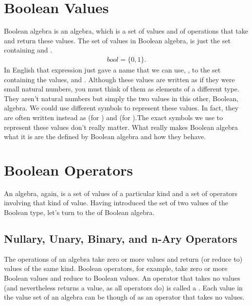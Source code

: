 \documentclass[letterpaper,10pt,english]{sphinxmanual}
\begin{document}
\section{Boolean Values}
\label{\detokenize{07-boolean-algebra:boolean-values}}
Boolean algebra is an algebra, which is a set of values and of
operations that take and return these values. The set of values in
Boolean algebra, is just the set containing  and .
\begin{equation*}
\begin{split}bool = \{ 0, 1 \}.\end{split}
\end{equation*}
In English that expression just gave a name that we can use, ,
to the set containing the values,  and . Although these values
are written as if they were small natural numbers, you must think of
them as elements of a different type. They aren’t natural numbers but
simply the two values in this other, Boolean, algebra. We could use
different symbols to represent these values. In fact, they are often
written instead as  (for ) and  (for ).The exact
symbols we use to represent these values don’t really matter. What
really makes Boolean algebra what it is are the  defined
by Boolean algebra and how they behave.


\section{Boolean Operators}
\label{\detokenize{07-boolean-algebra:boolean-operators}}
An algebra, again, is a set of values of a particular kind and a set
of operators involving that kind of value. Having introduced the set
of two values of the Boolean type, let’s turn to the  of
Boolean algebra.


\subsection{Nullary, Unary, Binary, and n-Ary Operators}
\label{\detokenize{07-boolean-algebra:nullary-unary-binary-and-n-ary-operators}}
The operations of an algebra take zero or more values and return (or
reduce to) values of the same kind. Boolean operators, for example,
take zero or more Boolean values and reduce to Boolean values. An
operator that takes no values (and nevertheless returns a value, as
all operators do) is called a . Each value in the value set
of an algebra can be though of as an operator that takes no values.
\end{document}
